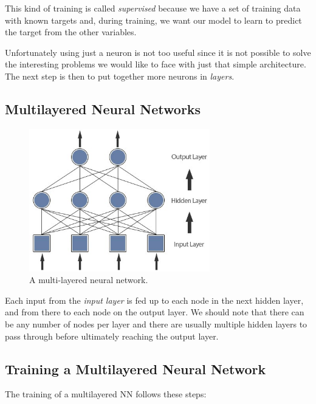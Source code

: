This kind of training is called \emph{supervised} because we have a set of training data with known targets and, during training, we want our model to learn to predict the target from the other variables.

Unfortunately using just a neuron is not too useful since it is not
possible to solve the interesting problems we would like to face with
just that simple architecture. The next step is then to put together
more neurons in \emph{layers}.

\subsection{Multilayered Neural Networks}\label{multi-layered-neural-networks}

\begin{figure}[htb]
	\centering
	\includegraphics[width=0.7\textwidth]{figures/multilayer.jpeg}
	\caption{A multi-layered neural network.}
\end{figure}

Each input from the \emph{input layer} is fed up to each node in the
next hidden layer, and from there to each node on the output layer. We
should note that there can be any number of nodes per layer and there
are usually multiple hidden layers to pass through before ultimately
reaching the output layer.

\subsection{Training a Multilayered Neural 		Network}\label{training-a-multilayered-neural-network}

The training of a multilayered NN follows these steps:


